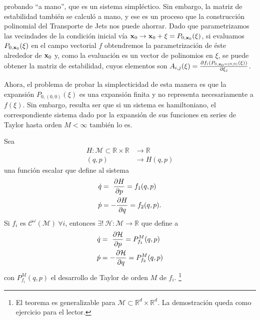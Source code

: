 probando ``a mano'', que es un sistema simpléctico. Sin embargo, la matriz de estabilidad también se calculó a mano, y ese es un proceso que la construcción polinomial del Transporte de Jets nos puede ahorrar. Dado que parametrizamos las vecindades de la condición inicial vía $\mathbf{x}_0 \to \mathbf{x}_0 + \xi = P_{0,\mathbf{x}_0}(\xi)$, si evaluamos $P_{0,\mathbf{x}_0}(\xi)$ en el campo vectorial $f$ obtendremos la parametrización de éste alrededor de $\mathbf{x}_0$ y, como la evaluación es un vector de polinomios en $\xi$, se puede obtener la matriz de estabilidad, cuyos elementos son $A_{i,j}(\xi) = \frac{\partial f_i(P_{0,\mathbf{x}_0=(0,0)}(\xi))}{\partial \xi_j}$.

Ahora, el problema de probar la simplecticidad de esta manera es que la expansión $P_{0,(0,0)}(\xi)$ es una expansión finita y no representa necesariamente a $f(\xi)$. Sin embargo, resulta ser que si un sistema es hamiltoniano, el correspondiente sistema dado por la expansión de sus funciones en series de Taylor hasta orden $M < \infty$ también lo es.

\begin{teorema}
Sea 
\begin{align*}
  H: \mathcal{M} \subset \mathbb{R} \times\mathbb{R} &\to \mathbb{R} \\ 
  (q,p) &\to H(q,p)
\end{align*}
una función escalar que define al sistema
\begin{align}
 \dot{q} &= \ \frac{\partial H}{\partial p} = f_1(q,p) \nonumber \\
 \dot{p} &= - \frac{\partial H}{\partial q} = f_2(q,p).
 \label{eq:theorem_ode}
\end{align}
Si $f_i$ es $\mathcal{C}^\omega(\mathcal{M}) \ \forall i$, entonces $\exists! \  \mathcal{H}: \mathcal{M} \to \mathbb{R}$ que define a
\begin{align*}
 \dot{q} &= \ \frac{\partial \mathcal{H}}{\partial p} = P_{f_1}^M(q,p) \\
 \dot{p} &= - \frac{\partial \mathcal{H}}{\partial q} = P_{f_2}^M(q,p)
\end{align*}
con $P_{f_i}^M(q,p)$ el desarrollo de Taylor de orden $M$ de $f_i$.
\footnote{El teorema es generalizable para $\mathcal{M} \subset \mathbb{R}^d \times \mathbb{R}^d$. La demostración queda como ejercicio para el lector.}
\end{teorema}


